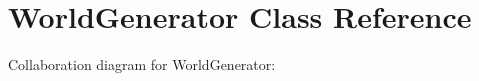 \hypertarget{classWorldGenerator}{}\section{World\+Generator Class Reference}
\label{classWorldGenerator}


Collaboration diagram for World\+Generator\+:
